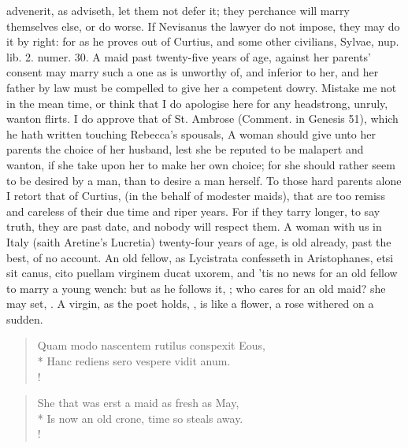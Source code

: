 advenerit, as \Chrysostom{} adviseth, let them not defer it; they
perchance will marry themselves else, or do worse. If Nevisanus the
lawyer do not impose, they may do it by right: for as he proves out of
Curtius, and some other civilians, Sylvae, nup. lib. 2. numer. 30.
A maid past twenty-five years of age, against her parents'
consent may marry such a one as is unworthy of, and inferior to her,
and her father by law must be compelled to give her a competent dowry.
Mistake me not in the mean time, or think that I do apologise here for
any headstrong, unruly, wanton flirts. I do approve that of St. Ambrose
(Comment. in Genesis  51), which he hath written touching
Rebecca's spousals, A woman should give unto her parents the choice of
her husband, lest she be reputed to be malapert and wanton, if
she take upon her to make her own choice; for she should rather
seem to be desired by a man, than to desire a man herself. To those
hard parents alone I retort that of Curtius, (in the behalf of modester
maids), that are too remiss and careless of their due time and riper
years. For if they tarry longer, to say truth, they are past date, and
nobody will respect them. A woman with us in Italy (saith
Aretine's Lucretia) twenty-four years of age, is old already,
past the best, of no account. An old fellow, as Lycistrata confesseth
in Aristophanes, etsi sit canus, cito puellam virginem ducat
uxorem, and 'tis no news for an old fellow to marry a young wench: but
as he follows it, ; who cares
for an old maid? she may set, \etc{}. A virgin, as the poet holds, , is like a flower, a rose withered on a
sudden.
%
\begin{latin}%
\begin{verse}%
Quam modo nascentem rutilus conspexit Eous,\\*
Hanc rediens sero vespere vidit anum.\\!
\end{verse}%
\end{latin}%
\translationrule%
\begin{verse}%
She that was erst a maid as fresh as May,\\*
Is now an old crone, time so steals away.\\!
\end{verse}%
%

